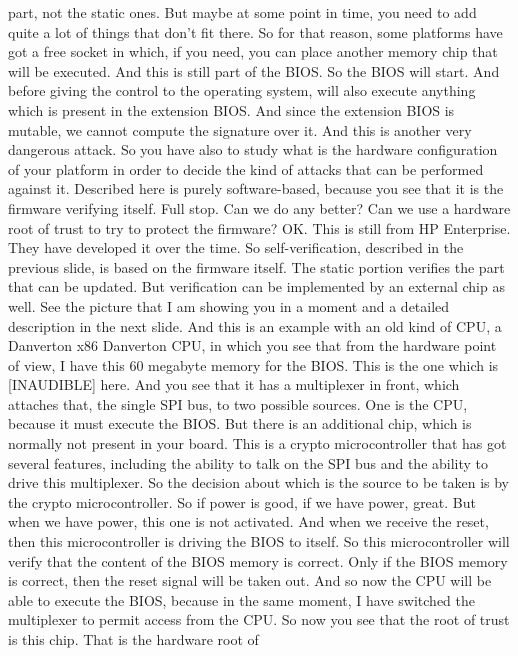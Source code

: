  part, not the static ones. But maybe at some point in time, you need to add
 quite a lot of things that don't fit there. So for that reason, some platforms
 have got a free socket in which, if you need, you can place another memory
 chip that will be executed. And this is still part of the BIOS. So the BIOS
 will start. And before giving the control to the operating system, will also
 execute anything which is present in the extension BIOS. And since the
 extension BIOS is mutable, we cannot compute the signature over it. And this
 is another very dangerous attack. So you have also to study what is the
 hardware configuration of your platform in order to decide the kind of attacks
 that can be performed against it. Described here is purely software-based,
 because you see that it is the firmware verifying itself. Full stop. Can we do
 any better? Can we use a hardware root of trust to try to protect the
 firmware? OK. This is still from HP Enterprise. They have developed it over
 the time. So self-verification, described in the previous slide, is based on
 the firmware itself. The static portion verifies the part that can be updated.
 But verification can be implemented by an external chip as well. See the
 picture that I am showing you in a moment and a detailed description in the
 next slide. And this is an example with an old kind of CPU, a Danverton x86
 Danverton CPU, in which you see that from the hardware point of view, I have
 this 60 megabyte memory for the BIOS. This is the one which is [INAUDIBLE]
 here. And you see that it has a multiplexer in front, which attaches that, the
 single SPI bus, to two possible sources. One is the CPU, because it must
 execute the BIOS. But there is an additional chip, which is normally not
 present in your board. This is a crypto microcontroller that has got several
 features, including the ability to talk on the SPI bus and the ability to
 drive this multiplexer. So the decision about which is the source to be taken
 is by the crypto microcontroller. So if power is good, if we have power,
 great. But when we have power, this one is not activated. And when we receive
 the reset, then this microcontroller is driving the BIOS to itself. So this
 microcontroller will verify that the content of the BIOS memory is correct.
 Only if the BIOS memory is correct, then the reset signal will be taken out.
 And so now the CPU will be able to execute the BIOS, because in the same
 moment, I have switched the multiplexer to permit access from the CPU. So now
 you see that the root of trust is this chip. That is the hardware root of
